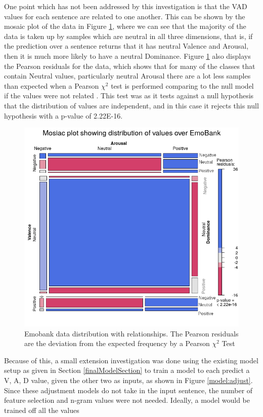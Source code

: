 One point which has not been addressed by this investigation is that the VAD values for each sentence are related to one another. This can be shown by the mosaic plot of the data in Figure \ref{mosaic:emo}, where we can see that the majority of the data is taken up by samples which are neutral in all three dimensions, that is, if the prediction over a sentence returns that it has neutral Valence and Arousal, then it is much more likely to have a neutral Dominance. Figure \ref{mosaic:emo} also displays the Pearson residuals for the data, which shows that for many of the classes that contain Neutral values, particularly neutral Arousal there are a lot less samples than expected when a Pearson $\chi^2$ test is performed comparing to the null model if the values were not related \cite{zeileis2007residual}. This test was as it tests against a null hypothesis that the distribution of values are independent, and in this case it rejects this null hypothesis with a p-value of 2.22E-16.
\begin{figure}[ht]
\centering
\includegraphics[scale=0.7]{graphs/mosaic_new.png}
\caption{Emobank data distribution with relationships. The Pearson residuals are the deviation from the expected frequency by a Pearson $\chi^2$ Test \cite{pearson1900x}}
\label{mosaic:emo}
\end{figure}

Because of this, a small extension investigation was done using the existing model setup as given in Section \ref{finalModelSection} to train a model to each predict a V, A, D value, given the other two as inputs, as shown in Figure \ref{model:adjust}. Since these adjustment models do not take in the input sentence, the number of feature selection and n-gram values were not needed. Ideally, a model would be trained off all the values 

